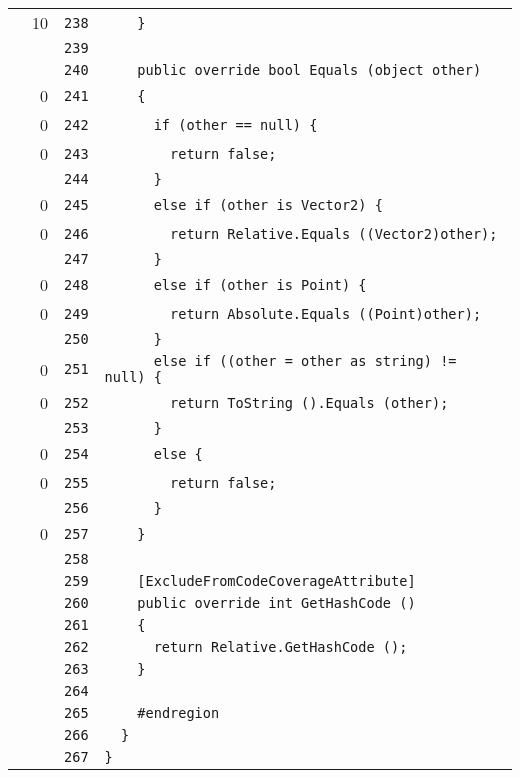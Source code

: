 \documentclass[a4paper,10pt]{article}
\begin{document}
\begin{longtable}[l]{lrrl}
\cellcolor{green} & 10 & \verb~238~ & \verb~    }~\\
\cellcolor{gray} &  & \verb~239~ & \verb~~\\
\cellcolor{gray} &  & \verb~240~ & \verb~    public override bool Equals (object other)~\\
\cellcolor{red} & 0 & \verb~241~ & \verb~    {~\\
\cellcolor{red} & 0 & \verb~242~ & \verb~      if (other == null) {~\\
\cellcolor{red} & 0 & \verb~243~ & \verb~        return false;~\\
\cellcolor{gray} &  & \verb~244~ & \verb~      }~\\
\cellcolor{red} & 0 & \verb~245~ & \verb~      else if (other is Vector2) {~\\
\cellcolor{red} & 0 & \verb~246~ & \verb~        return Relative.Equals ((Vector2)other);~\\
\cellcolor{gray} &  & \verb~247~ & \verb~      }~\\
\cellcolor{red} & 0 & \verb~248~ & \verb~      else if (other is Point) {~\\
\cellcolor{red} & 0 & \verb~249~ & \verb~        return Absolute.Equals ((Point)other);~\\
\cellcolor{gray} &  & \verb~250~ & \verb~      }~\\
\cellcolor{red} & 0 & \verb~251~ & \verb~      else if ((other = other as string) != null) {~\\
\cellcolor{red} & 0 & \verb~252~ & \verb~        return ToString ().Equals (other);~\\
\cellcolor{gray} &  & \verb~253~ & \verb~      }~\\
\cellcolor{red} & 0 & \verb~254~ & \verb~      else {~\\
\cellcolor{red} & 0 & \verb~255~ & \verb~        return false;~\\
\cellcolor{gray} &  & \verb~256~ & \verb~      }~\\
\cellcolor{red} & 0 & \verb~257~ & \verb~    }~\\
\cellcolor{gray} &  & \verb~258~ & \verb~~\\
\cellcolor{gray} &  & \verb~259~ & \verb~    [ExcludeFromCodeCoverageAttribute]~\\
\cellcolor{gray} &  & \verb~260~ & \verb~    public override int GetHashCode ()~\\
\cellcolor{gray} &  & \verb~261~ & \verb~    {~\\
\cellcolor{gray} &  & \verb~262~ & \verb~      return Relative.GetHashCode ();~\\
\cellcolor{gray} &  & \verb~263~ & \verb~    }~\\
\cellcolor{gray} &  & \verb~264~ & \verb~~\\
\cellcolor{gray} &  & \verb~265~ & \verb~    #endregion~\\
\cellcolor{gray} &  & \verb~266~ & \verb~  }~\\
\cellcolor{gray} &  & \verb~267~ & \verb~}~\\
\end{longtable}
\end{document}
